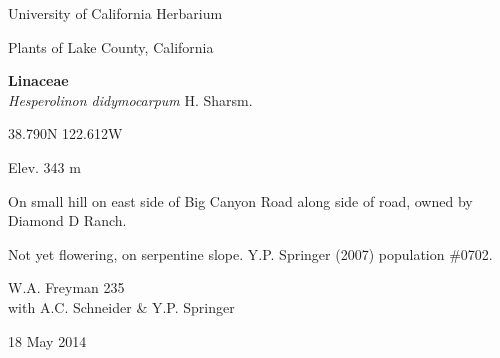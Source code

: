 \documentclass[letterpaper,10pt]{article}
\begin{document}
\begin{minipage}[t]{0.40\textwidth}

\begin{center}
University of California Herbarium \\
\begin{large}
Plants of Lake County, California \\
\end{large}
\vspace{\baselineskip}
\textbf{Linaceae} \\
\textit{Hesperolinon didymocarpum} H. Sharsm.\\
\end{center}

\begin{footnotesize}

\begin{multicols}{2}
38.790\textdegree N 122.612\textdegree W
\columnbreak
\begin{flushright}
Elev. 343 m
\end{flushright}
\end{multicols}

On small hill on east side of Big Canyon Road along side of road, owned by Diamond D Ranch.
\vspace{\baselineskip}

Not yet flowering, on serpentine slope. Y.P. Springer (2007) population \#0702.

\begin{multicols}{2}
W.A. Freyman 235 \\
with A.C. Schneider \& Y.P. Springer
\columnbreak
\begin{flushright}
18 May 2014
\end{flushright}
\end{multicols}

\end{footnotesize}

\end{minipage}

\vspace{2cm}
%
%

%
%
\end{document}
